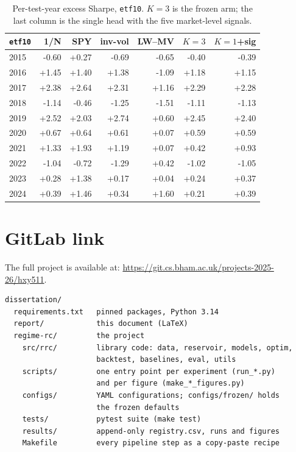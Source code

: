 \begin{table}[t]
  \centering
  \small
  \begin{tabular}{l rrrrrr}
    \hline
    \texttt{etf10} & 1/N & SPY & inv-vol & LW--MV & $K{=}3$ & $K{=}1$+sig \\
    \hline
    2015 & -0.60 & +0.27 & -0.69 & -0.65 & -0.40 & -0.39 \\
    2016 & +1.45 & +1.40 & +1.38 & -1.09 & +1.18 & +1.15 \\
    2017 & +2.38 & +2.64 & +2.31 & +1.16 & +2.29 & +2.28 \\
    2018 & -1.14 & -0.46 & -1.25 & -1.51 & -1.11 & -1.13 \\
    2019 & +2.52 & +2.03 & +2.74 & +0.60 & +2.45 & +2.40 \\
    2020 & +0.67 & +0.64 & +0.61 & +0.07 & +0.59 & +0.59 \\
    2021 & +1.33 & +1.93 & +1.19 & +0.07 & +0.42 & +0.93 \\
    2022 & -1.04 & -0.72 & -1.29 & +0.42 & -1.02 & -1.05 \\
    2023 & +0.28 & +1.38 & +0.17 & +0.04 & +0.24 & +0.37 \\
    2024 & +0.39 & +1.46 & +0.34 & +1.60 & +0.21 & +0.39 \\
    \hline
  \end{tabular}
  \caption[Per-year Sharpe, \texttt{etf10}]{Per-test-year excess Sharpe,
  \texttt{etf10}. $K{=}3$ is the frozen arm; the last column is the single
  head with the five market-level signals.}
  \label{tab:app-peryear-e10}
\end{table}

\chapter{GitLab link}
\label{app:gitlab}

The full project is available at: \url{https://git.cs.bham.ac.uk/projects-2025-26/hxy511}.

\begin{verbatim}
dissertation/
  requirements.txt   pinned packages, Python 3.14
  report/            this document (LaTeX)
  regime-rc/         the project
    src/rrc/         library code: data, reservoir, models, optim,
                     backtest, baselines, eval, utils
    scripts/         one entry point per experiment (run_*.py)
                     and per figure (make_*_figures.py)
    configs/         YAML configurations; configs/frozen/ holds
                     the frozen defaults
    tests/           pytest suite (make test)
    results/         append-only registry.csv, runs and figures
    Makefile         every pipeline step as a copy-paste recipe
\end{verbatim}


